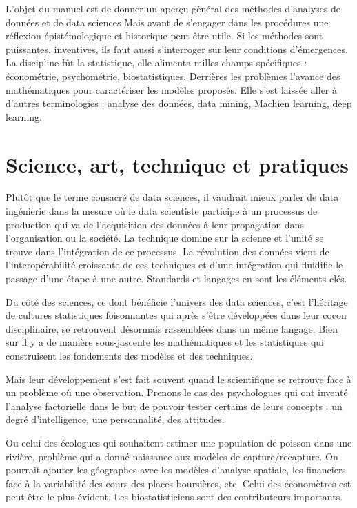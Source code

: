 \documentclass[
]{book}
\begin{document}
L'objet du manuel est de donner un aperçu général des méthodes d'analyses de données et de data sciences Mais avant de s'engager dans les procédures une réflexion épistémologique et historique peut être utile. Si les méthodes sont puissantes, inventives, ils faut aussi s'interroger sur leur conditions d'émergences.
La discipline fût la statistique, elle alimenta milles champs spécifiques : économétrie, psychométrie, biostatistiques. Derrières les problèmes l'avance des mathématiques pour caractériser les modèles proposés. Elle s'est laissée aller à d'autres terminologies : analyse des données, data mining, Machien learning, deep learning.

\hypertarget{science-art-technique-et-pratiques}{%
\section{Science, art, technique et pratiques}\label{science-art-technique-et-pratiques}}

Plutôt que le terme consacré de data sciences, il vaudrait mieux parler de data ingénierie dans la mesure où le data scientiste participe à un processus de production qui va de l'acquisition des données à leur propagation dans l'organisation ou la société. La technique domine sur la science et l'unité se trouve dans l'intégration de ce processus. La révolution des données vient de l'interopérabilité croissante de ces techniques et d'une intégration qui fluidifie le passage d'une étape à une autre. Standards et langages en sont les éléments clés.

Du côté des sciences, ce dont bénéficie l'univers des data sciences, c'est l'héritage de cultures statistiques foisonnantes qui après s'être développées dans leur cocon disciplinaire, se retrouvent désormais rassemblées dans un même langage. Bien sur il y a de manière sous-jascente les mathématiques et les statistiques qui construisent les fondements des modèles et des techniques.

Mais leur développement s'est fait souvent quand le scientifique se retrouve face à un problème où une observation. Prenons le cas des psychologues qui ont inventé l'analyse factorielle dans le but de pouvoir tester certains de leurs concepts : un degré d'intelligence, une personnalité, des attitudes.

Ou celui des écologues qui souhaitent estimer une population de poisson dans une rivière, problème qui a donné naissance aux modèles de capture/recapture. On pourrait ajouter les géographes avec les modèles d'analyse spatiale, les financiers face à la variabilité des cours des places boursières, etc. Celui des économètres est peut-être le plus évident. Les biostatisticiens sont des contributeurs importants.
\end{document}
